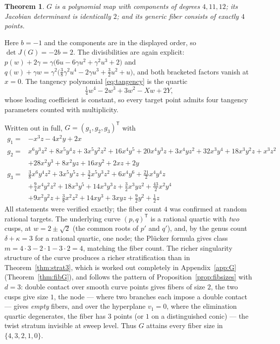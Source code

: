 \documentclass[11pt]{article}
\theoremstyle{plain}
\newtheorem{theorem}{Theorem}[section]
\theoremstyle{definition}
\theoremstyle{remark}
\begin{document}
\begin{theorem}\label{thm:deg4}
$G$ is a polynomial map with components of degrees $4,11,12$; its Jacobian
determinant is identically $2$; and its generic fiber consists of exactly
$4$ points.
\end{theorem}

Here $b=-1$ and the components are in the displayed order, so
$\det J(G)=-2b=2$. The divisibilities are again explicit:
$p(w)+2\gamma=\gamma\bigl(6u-6\gamma u^2+\gamma^2u^3+2\bigr)$
and $q(w)+\gamma w=\gamma^2\bigl(\tfrac38\gamma^2u^4-2\gamma u^3+\tfrac32
u^2+u\bigr)$, and both bracketed factors vanish at $x=0$. The tangency
polynomial \eqref{eq:tangency} is the quartic
\[
\tfrac14 w^4-2w^3+3w^2-Xw+2Y ,
\]
whose leading coefficient is constant, so every target point admits four tangency
parameters counted with multiplicity.

Written out in full, $G=(g_1,g_2,g_3)^{\mathsf T}$ with
{\small
\begin{align*}
g_1 ={}& -x^3z-4x^2y+2x\\[2pt]
g_2 ={}& x^6y^3z^2+8x^5y^4z+3x^5y^2z^2+16x^4y^5+20x^4y^3z+3x^4yz^2+32x^3y^4+18x^3y^2z+x^3z^2\\
&+28x^2y^3+8x^2yz+16xy^2+2xz+2y\\[2pt]
g_3 ={}& \tfrac{3}{8}x^6y^4z^2+3x^5y^5z+\tfrac{3}{2}x^5y^3z^2+6x^4y^6+\tfrac{21}{2}x^4y^4z\\
&+\tfrac{9}{4}x^4y^2z^2+18x^3y^5+14x^3y^3z+\tfrac{3}{2}x^3yz^2+\tfrac{43}{2}x^2y^4\\
&+9x^2y^2z+\tfrac{3}{8}x^2z^2+14xy^3+3xyz+\tfrac{9}{2}y^2+\tfrac{1}{2}z
\end{align*}
}
All statements were verified exactly; the fiber count $4$ was confirmed at random
rational targets. The underlying curve $(p,q)^{\mathsf T}$ is a rational quartic with
\emph{two} cusps, at $w=2\pm\sqrt2$ (the common roots of $p'$ and $q'$), and, by
the genus count $\delta+\kappa=3$ for a rational quartic, one node; the Pl\"ucker
formula gives class $m=4\cdot3-2\cdot1-3\cdot2=4$, matching the fiber count. The
richer singularity structure of the curve produces a richer stratification than in
Theorem~\ref{thm:strat3}, which is worked out completely in
Appendix~\ref{app:G} (Theorem~\ref{thm:fibG}), and follows the pattern of
Proposition~\ref{prop:fibsizes} with $d=3$: double contact over smooth curve
points gives fibers of size $2$, the two cusps give size $1$, the node --- where
two branches each impose a double contact --- gives \emph{empty} fibers, and over
the hyperplane $v_1=0$, where the elimination quartic degenerates, the fiber has
$3$ points (or $1$ on a distinguished conic) --- the twist stratum invisible at
sweep level. Thus $G$ attains every fiber size in $\{4,3,2,1,0\}$.
\end{document}
